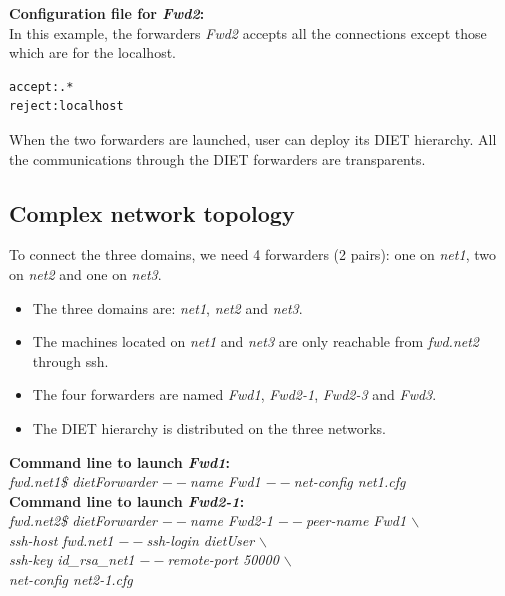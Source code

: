 \noindent\textbf{Configuration file for \textit{Fwd2}:}\\
In this example, the forwarders \textit{Fwd2} accepts all the
connections except those which are for the localhost.
\begin{verbatim}
accept:.*
reject:localhost
\end{verbatim}

When the two forwarders are launched, user can deploy its DIET
hierarchy. All the communications through the DIET forwarders are
transparents.

\subsection{Complex network topology}
To connect the three domains, we need 4 forwarders (2 pairs): one on
\textit{net1}, two on \textit{net2} and one on \textit{net3}.
\begin{itemize}
\item The three domains are: \textit{net1}, \textit{net2} and
  \textit{net3}.
\item The machines located on \textit{net1} and \textit{net3} are only
  reachable from \textit{fwd.net2} through ssh.
\item The four forwarders are named \textit{Fwd1}, \textit{Fwd2-1},
  \textit{Fwd2-3} and \textit{Fwd3}.
\item The DIET hierarchy is distributed on the three networks.\\
\end{itemize}

\noindent\textbf{Command line to launch \textit{Fwd1}: }\\
{\small \it fwd.net1\$ dietForwarder {\tiny$--$}name Fwd1
  {\tiny$--$}net-config net1.cfg}\\[2mm]

\noindent\textbf{Command line to launch \textit{Fwd2-1}: }\\
{\small \it fwd.net2\$ dietForwarder {\tiny$--$}name Fwd2-1
  {\tiny$--$}peer-name Fwd1 $\backslash$\\
  \hspace*{4.2cm}{\tiny$--$}ssh-host fwd.net1 {\tiny$--$}ssh-login
  dietUser $\backslash$\\
  \hspace*{4.2cm}{\tiny$--$}ssh-key id\_rsa\_net1
  {\tiny$--$}remote-port 50000 $\backslash$\\
  \hspace*{4.2cm}{\tiny$--$}net-config net2-1.cfg}\\[2mm]

